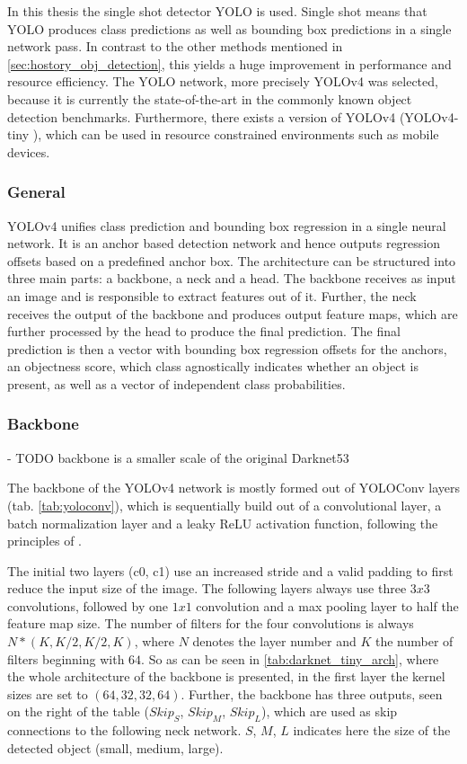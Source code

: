 
In this thesis the single shot detector \ac{YOLO} \cite{yolov1} is used.
Single shot means that \ac{YOLO} produces class predictions as well as bounding box predictions in a single network pass.
In contrast to the other methods mentioned in \ref{sec:hostory_obj_detection}, this yields a huge improvement in performance and resource efficiency.
The \ac{YOLO} network, more precisely \ac{YOLOv4} \cite{yolov4} was selected, because it is currently the state-of-the-art in the commonly known object detection benchmarks.
Furthermore, there exists a version of \ac{YOLOv4} (YOLOv4-tiny \cite{yolov4_tiny}), which can be used in resource constrained environments such as mobile devices.

\subsubsection{General}

\ac{YOLOv4} unifies class prediction and bounding box regression in a single neural network.
It is an anchor based detection network and hence outputs regression offsets based on a predefined anchor box.
The architecture can be structured into three main parts: a backbone, a neck and a head.
The backbone receives as input an image and is responsible to extract features out of it.
Further, the neck receives the output of the backbone and produces output feature maps, which are further processed by the head to produce the final prediction.
The final prediction is then a vector with bounding box regression offsets for the anchors, an objectness score, which class agnostically indicates whether an object is present, as well as a vector of independent class probabilities.

\subsubsection{Backbone}

- TODO backbone is a smaller scale of the original Darknet53

The backbone of the \ac{YOLOv4} network is mostly formed out of YOLOConv layers (tab. \ref{tab:yoloconv}), which is sequentially build out of a convolutional layer, a batch normalization layer and a leaky \ac{ReLU} activation function, following the principles of \cite{batchnorm}.


The initial two layers (c0, c1) use an increased stride and a valid padding to first reduce the input size of the image.
The following layers always use three $3x3$ convolutions, followed by one $1x1$ convolution and a max pooling layer to half the feature map size.
The number of filters for the four convolutions is always $N * (K, K/2, K/2, K)$, where $N$ denotes the layer number and $K$ the number of filters beginning with $64$.
So as can be seen in \ref{tab:darknet_tiny_arch}, where the whole architecture of the backbone is presented, in the first layer the kernel sizes are set to $(64, 32, 32, 64)$.
Further, the backbone has three outputs, seen on the right of the table ($Skip_S$, $Skip_M$, $Skip_L$), which are used as skip connections to the following neck network.
$S$, $M$, $L$ indicates here the size of the detected object (small, medium, large).



